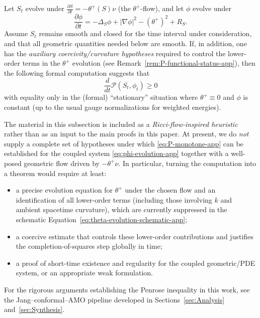 \begin{theorem}
\label{thm:spacetime-monotonicity-app}
Let $S_t$ evolve under $\frac{\partial S}{\partial t} = -\theta^+(S)\nu$ (the $\theta^+$-flow), and let $\phi$ evolve under
\begin{equation}
\frac{\partial \phi}{\partial t} = -\Delta_S \phi + |\nabla \phi|^2 - (\theta^+)^2 + R_S.
\label{eq:phi-evolution-app}
\end{equation}
Assume $S_t$ remains smooth and closed for the time interval under consideration, and that all geometric quantities needed below are smooth.
If, in addition, one has the \emph{auxiliary coercivity/curvature hypotheses} required to control the lower-order terms in the $\theta^+$ evolution (see Remark~\ref{rem:P-functional-status-app}), then the following formal computation suggests that
\begin{equation}
\frac{d}{dt}\mathcal{P}(S_t, \phi_t) \geq 0
\label{eq:P-monotone-app}
\end{equation}
with equality only in the (formal) ``stationary'' situation where $\theta^+ \equiv 0$ and $\phi$ is constant (up to the usual gauge normalizations for weighted energies).
\end{theorem}

\begin{remark}
\label{rem:P-functional-status-app}
The material in this subsection is included as a \emph{Ricci-flow-inspired heuristic} rather than as an input to the main proofs in this paper.
At present, we do \emph{not} supply a complete set of hypotheses under which \eqref{eq:P-monotone-app} can be established for the coupled system
\eqref{eq:phi-evolution-app} together with a well-posed geometric flow driven by $-\theta^+\nu$.
In particular, turning the computation into a theorem would require at least:
\begin{itemize}
\item a precise evolution equation for $\theta^+$ under the chosen flow and an identification of all lower-order terms (including those involving $k$ and ambient spacetime curvature), which are currently suppressed in the schematic Equation~\eqref{eq:theta-evolution-schematic-app};
\item a coercive estimate that controls these lower-order contributions and justifies the completion-of-squares step globally in time;
\item a proof of short-time existence and regularity for the coupled geometric/PDE system, or an appropriate weak formulation.
\end{itemize}
For the rigorous arguments establishing the Penrose inequality in this work, see the Jang--conformal--AMO pipeline developed in Sections~\ref{sec:Analysis} and~\ref{sec:Synthesis}.
\end{remark}

